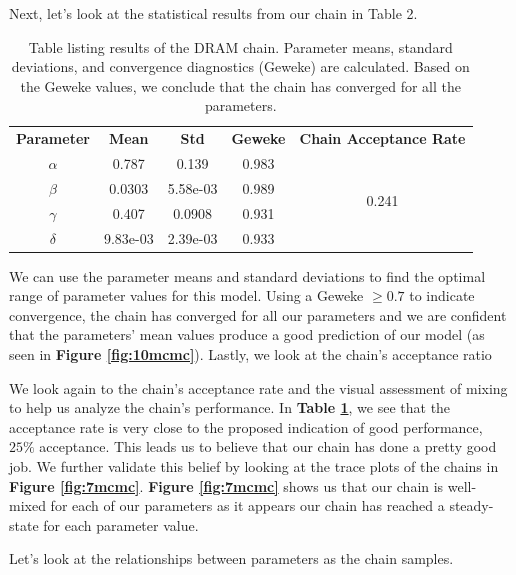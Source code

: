 \documentclass{article}
\begin{document}
\par Next, let's look at the statistical results from our chain in Table 2.
\begin{table}[H]
\centering
        \begin{tabular}{c|c c c |c}
            \hline
            \textbf{Parameter} & \textbf{Mean} &  \textbf{Std} & \textbf{ Geweke} &\textbf{Chain Acceptance Rate}\\ 
            \cline{1-5}
            $\alpha$ & 0.787 & 0.139 & 0.983 & \multirow{4}{*}{0.241} \\
            $\beta$ & 0.0303 & 5.58e-03 & 0.989\\
            $\gamma$ & 0.407 & 0.0908 & 0.931\\
            $\delta$ &  9.83e-03 & 2.39e-03 & 0.933
             \\\hline
                          \hline
                           
        \end{tabular}
    \caption{Table listing results of the DRAM chain. Parameter means, standard deviations, and convergence diagnostics (Geweke) are calculated. Based on the Geweke values, we conclude that the chain has converged for all the parameters.}
    \label{tab:2mcmc}
\end{table}
We can use the parameter means and standard deviations to find the optimal range of parameter values for this model. Using a Geweke $\geq 0.7$ to indicate convergence, the chain has converged for all our parameters and we are confident that the parameters' mean values produce a good prediction of our model (as seen in \textbf{Figure \ref{fig:10mcmc}}). Lastly, we look at the chain's acceptance ratio 
\par We look again to the chain's acceptance rate and the visual assessment of mixing to help us analyze the chain's performance. In \textbf{Table \ref{tab:2mcmc}}, we see that the acceptance rate is very close to the proposed indication of good performance, $25\%$ acceptance. This leads us to believe that our chain has done a pretty good job. We further validate this belief by looking at the trace plots of the chains in \textbf{Figure \ref{fig:7mcmc}}. \textbf{Figure \ref{fig:7mcmc}} shows us that our chain is well-mixed for each of our parameters as it appears our chain has reached a steady-state for each parameter value. 
\par Let's look at the relationships between parameters as the chain samples.
\end{document}
